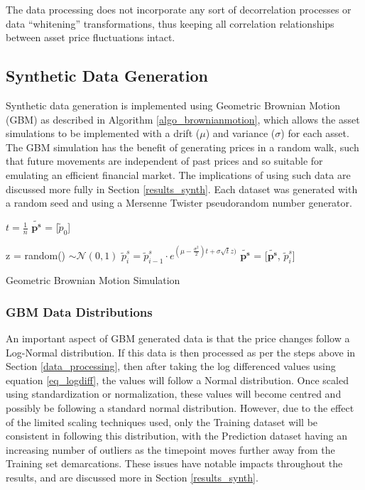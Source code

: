 \documentclass[a4paper,11pt,oneside]{article}
\theoremstyle{plain}
\theoremstyle{definition}
\begin{document}
	The data processing does not incorporate any sort of decorrelation processes or data ``whitening'' transformations, thus keeping all correlation relationships between asset price fluctuations intact.
	
	\subsection{Synthetic Data Generation}\label{data_synthetic}
	
	Synthetic data generation is implemented using Geometric Brownian Motion (GBM) as described in Algorithm \ref{algo_brownianmotion}, which allows the asset simulations to be implemented with a drift ($\mu$) and variance ($\sigma$) for each asset. The GBM simulation has the benefit of generating prices in a random walk, such that future movements are independent of past prices and so suitable for emulating an efficient financial market. The implications of using such data are discussed more fully in Section \ref{results_synth}. Each dataset was generated with a random seed and using a Mersenne Twister pseudorandom number generator. \newline
	
	\begin{algorithm}[H]
		
		$t = \frac{1}{n}$\;
		$\mathbf{\tilde{p^s}}$ = [$\tilde{p}_0$]\;
		
		{
			z = random()  $\sim \mathcal{N}(0,1)$\;
			$\tilde{p}^s_i = \tilde{p}^s_{i-1} \cdot e^{(\mu - \frac {\sigma^2}{2})t + \sigma  \sqrt{t}  z)}$\;
			$\mathbf{\tilde{p^s}}$ = [$\mathbf{\tilde{p^s}}$, $\tilde{p}^s_i$]\;
		}
		\label{algo_brownianmotion}
		\caption{Geometric Brownian Motion Simulation}
	\end{algorithm}
	
	\subsubsection{GBM Data Distributions}
	
	An important aspect of GBM generated data is that the price changes follow a Log-Normal distribution. If this data is then processed as per the steps above in Section \ref{data_processing}, then after taking the log differenced values using equation \eqref{eq_logdiff}, the values will follow a Normal distribution. Once scaled using standardization or normalization, these values will become centred and possibly be following a standard normal distribution. However, due to the effect of the limited scaling techniques used, only the Training dataset will be consistent in following this distribution, with the Prediction dataset having an increasing number of outliers as the timepoint moves further away from the Training set demarcations. These issues have notable impacts throughout the results, and are discussed more in Section \ref{results_synth}.
	
\end{document}
